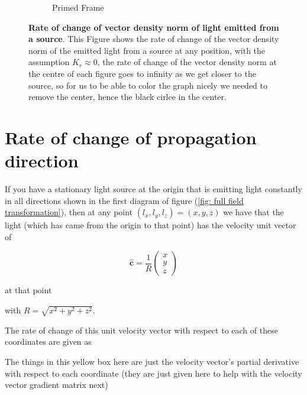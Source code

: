 \begin{figure}[H]
\begin{subfigure}{0.45\textwidth}
		\caption{Primed Frame}
		\label{subfig_2: light emitted from a source's rate of change of vector density norm}
	\end{subfigure}
	\caption{\textbf{Rate of change of vector density norm of light emitted from a source}. This Figure shows the rate of change of the vector density norm of the emitted light from a source at any position, with the assumption $K_r\approx 0$, the rate of change of the vector density norm at the centre of each figure goes to infinity as we get closer to the source, so for us to be able to color the graph nicely we needed to remove the center, hence the black cirlce in the center.}
	\label{fig: light emitted from a source's rate of change of vector density norm}
\end{figure}

\section{Rate of change of propagation direction}\label{sect: Rate of change of propagation direction}

If you have a stationary light source at the origin that is emitting light constantly in all directions shown in the first diagram of figure (\ref{fig: full field transformation}), then at any point $(l_x,l_y,l_z)=(x,y,z)$ we have that the light (which has came from the origin to that point) has the velocity unit vector of

\begin{equation}
	\mathbf{\hat{c}} = \frac{1}{R}
	\begin{pmatrix}
		x \\
		y \\
		z
	\end{pmatrix}
\end{equation}

at that point


with $R=\sqrt{x^2 + y^2 + z^2}$.

The rate of change of this unit velocity vector with respect to each of these coordinates are given as

The things in this yellow box here are just the velocity vector's partial derivative with respect to each coordinate (they are just given here to help with the velocity vector gradient matrix next)

